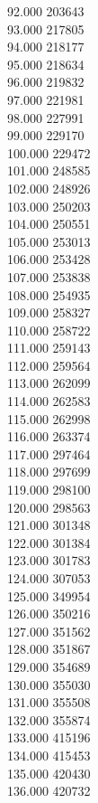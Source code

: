 { 92.000	203643 \\
 93.000	217805 \\
 94.000	218177 \\
 95.000	218634 \\
 96.000	219832 \\
 97.000	221981 \\
 98.000	227991 \\
 99.000	229170 \\
 100.000	229472 \\
 101.000	248585 \\
 102.000	248926 \\
 103.000	250203 \\
 104.000	250551 \\
 105.000	253013 \\
 106.000	253428 \\
 107.000	253838 \\
 108.000	254935 \\
 109.000	258327 \\
 110.000	258722 \\
 111.000	259143 \\
 112.000	259564 \\
 113.000	262099 \\
 114.000	262583 \\
 115.000	262998 \\
 116.000	263374 \\
 117.000	297464 \\
 118.000	297699 \\
 119.000	298100 \\
 120.000	298563 \\
 121.000	301348 \\
 122.000	301384 \\
 123.000	301783 \\
 124.000	307053 \\
 125.000	349954 \\
 126.000	350216 \\
 127.000	351562 \\
 128.000	351867 \\
 129.000	354689 \\
 130.000	355030 \\
 131.000	355508 \\
 132.000	355874 \\
 133.000	415196 \\
 134.000	415453 \\
 135.000	420430 \\
 136.000	420732 \\
}
